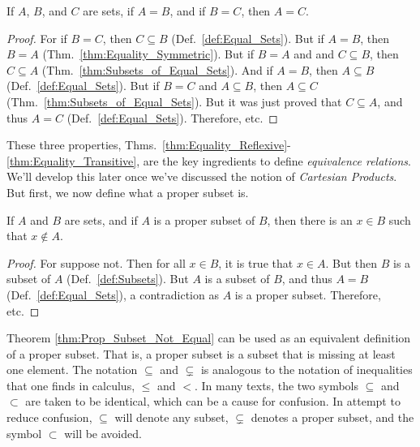        \begin{theorem}
            \label{thm:Equality_Transitive}%
            If $A$, $B$, and $C$ are sets, if $A=B$, and if
            $B=C$, then $A=C$.
        \end{theorem}
        \begin{proof}
            For if $B=C$, then $C\subseteq{B}$
            (Def.~\ref{def:Equal_Sets}). But if
            $A=B$, then $B=A$
            (Thm.~\ref{thm:Equality_Symmetric}). But if
            $B=A$ and and $C\subseteq{B}$, then
            $C\subseteq{A}$
            (Thm.~\ref{thm:Subsets_of_Equal_Sets}).
            And if $A=B$, then $A\subseteq{B}$
            (Def.~\ref{def:Equal_Sets}). But if $B=C$ and
            $A\subseteq{B}$, then $A\subseteq{C}$
            (Thm.~\ref{thm:Subsets_of_Equal_Sets}). But it
            was just proved that $C\subseteq{A}$, and
            thus $A=C$ (Def.~\ref{def:Equal_Sets}).
            Therefore, etc.
        \end{proof}
        These three properties,
        Thms.~\ref{thm:Equality_Reflexive}-%
        \ref{thm:Equality_Transitive}, are the key ingredients to define
        \textit{equivalence relations}. We'll develop this later once
        we've discussed the notion of \textit{Cartesian Products}.
        But first, we now define what a proper subset is.
        \begin{theorem}
            \label{thm:Prop_Subset_Not_Equal}%
            If $A$ and $B$ are sets, and if $A$ is a proper
            subset of $B$, then there is an $x\in{B}$ such
            that $x\notin{A}$.
        \end{theorem}
        \begin{proof}
            For suppose not. Then for all $x\in{B}$,
            it is true that $x\in{A}$. But then
            $B$ is a subset of $A$ (Def.~\ref{def:Subsets}).
            But $A$ is a subset of $B$, and thus $A=B$
            (Def.~\ref{def:Equal_Sets}), a contradiction as
            $A$ is a proper subset. Therefore, etc.
        \end{proof}
        Theorem \ref{thm:Prop_Subset_Not_Equal} can
        be used as an equivalent definition of a proper
        subset. That is, a proper subset is a subset that
        is missing at least one element. The notation
        $\subseteq$ and $\subsetneq$ is analogous to the
        notation of inequalities that one finds in calculus,
        $\leq$ and $<$. In many texts, the two symbols
        $\subseteq$ and $\subset$ are taken to be identical,
        which can be a cause for confusion. In attempt to
        reduce confusion, $\subseteq$ will denote any subset,
        $\subsetneq$ denotes a proper subset, and the symbol
        $\subset$ will be avoided.
